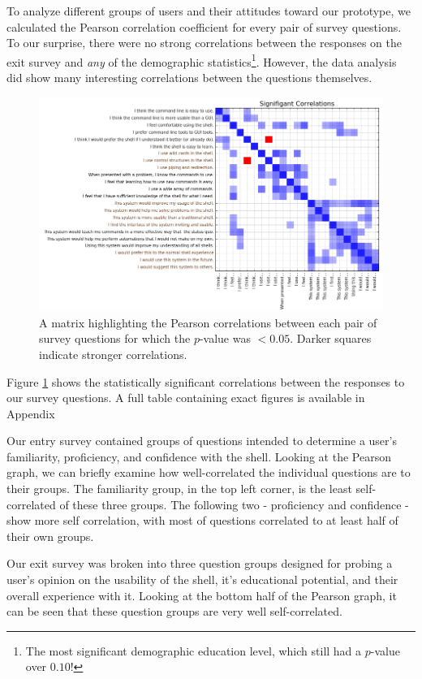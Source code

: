 To analyze different groups of users and their attitudes toward our prototype,
we calculated the Pearson correlation coefficient for every pair of survey
questions. To our surprise, there were no strong correlations between the
responses on the exit survey and \emph{any} of the demographic
statistics\footnote{The most significant demographic education level, which
  still had a $p$-value over $0.10$!}.  However, the data analysis did show many
interesting correlations between the questions themselves.

\begin{figure}[ht]
  \centering
  \includegraphics[width=\textwidth]{figures/stats/sig.png}
  \caption{A matrix highlighting the Pearson correlations between each pair of
    survey questions for which the $p$-value was $< 0.05$. Darker squares
    indicate stronger correlations.}
  \label{fig:pvalplot}
\end{figure}

Figure \ref{fig:pvalplot} shows the statistically significant correlations between
the responses to our survey questions. A full table containing exact figures is
available in Appendix

Our entry survey contained groups of questions intended to determine a user's
familiarity, proficiency, and confidence with the shell. Looking at the Pearson
graph, we can briefly examine how well-correlated the individual questions are
to their groups. The familiarity group, in the top left corner, is the least
self-correlated of these three groups. The following two \-- proficiency and
confidence \-- show more self correlation, with most of questions correlated to
at least half of their own groups.

Our exit survey was broken into three question groups designed for probing a
user's opinion on the usability of the shell, it's educational potential, and
their overall experience with it. Looking at the bottom half of the Pearson
graph, it can be seen that these question groups are very well self-correlated.

